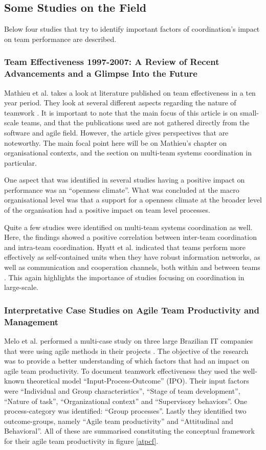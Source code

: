 \subsection{Some Studies on the Field}

Below four studies that try to identify important factors of coordination's impact on team performance are described.

\subsubsection{Team Effectiveness 1997-2007: A Review of Recent Advancements and a Glimpse Into the Future}

Mathieu et al. takes a look at literature published on team effectiveness in a ten year period. They look at several different aspects regarding the nature of teamwork \cite{Mathieu2008}. It is important to note that the main focus of this article is on small-scale teams, and that the publications used are not gathered directly from the software and agile field. However, the article gives perspectives that are noteworthy. The main focal point here will be on Mathieu's chapter on organisational contexts, and the section on multi-team systems coordination in particular.

One aspect that was identified in several studies having a positive impact on performance was an ``openness climate''. What was concluded at the macro organisational level was that a support for a openness climate at the broader level of the organisation had a positive impact on team level processes.

Quite a few studies were identified on multi-team systems coordination as well. Here, the findings showed a positive correlation between inter-team coordination and intra-team coordination. Hyatt et al. indicated that teams perform more effectively as self-contained units when they have robust information networks, as well as communication and cooperation channels, both within and between teams \cite{Hyatt1997}. This again highlights the importance of studies focusing on coordination in large-scale.

\subsubsection{Interpretative Case Studies on Agile Team Productivity and Management}

Melo et al. performed a multi-case study on three large Brazilian IT companies that were using agile methods in their projects \cite{Melo2013}. The objective of the research was to provide a better understanding of which factors that had an impact on agile team productivity. To document teamwork effectiveness they used the well-known theoretical model ``Input-Process-Outcome'' (IPO). Their input factors were ``Individual and Group characteristics'', ``Stage of team development'', ``Nature of task'', ``Organizational context'' and ``Supervisory behaviors''. One process-category was identified: ``Group processes''. Lastly they identified two outcome-groups, namely ``Agile team productivity'' and ``Attitudinal and Behavioral''. All of these are summarised constituting the conceptual framework for their agile team productivity in figure \ref{atpcf}.

